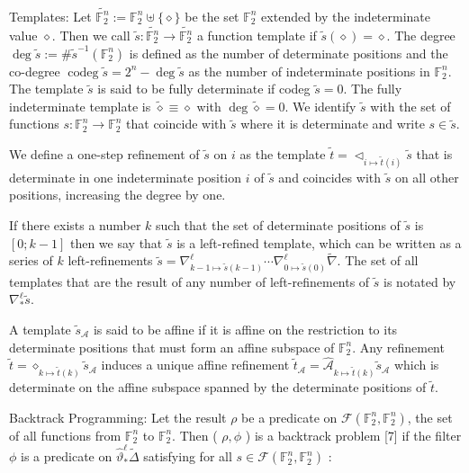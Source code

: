 \documentclass[10pt]{article}
\begin{document}
Templates: Let $\widetilde{\mathbb{F}_{2}^{n}}:=\mathbb{F}_{2}^{n} \uplus\{\diamond\}$ be the set $\mathbb{F}_{2}^{n}$ extended by the indeterminate value $\diamond$. Then we call $\tilde{s}: \widetilde{\mathbb{F}_{2}^{n}} \rightarrow \widetilde{\mathbb{F}_{2}^{n}}$ a function template if $\tilde{s}(\diamond)=\diamond$. The degree $\operatorname{deg} \tilde{s}:=\# \tilde{s}^{-1}\left(\mathbb{F}_{2}^{n}\right)$ is defined as the number of determinate positions and the co-degree $\operatorname{codeg} \tilde{s}=2^{n}-\operatorname{deg} \tilde{s}$ as the number of indeterminate positions in $\mathbb{F}_{2}^{n}$. The template $\tilde{s}$ is said to be fully determinate if codeg $\tilde{s}=0$. The fully indeterminate template is $\tilde{\diamond} \equiv \diamond$ with $\operatorname{deg} \tilde{\diamond}=0$. We identify $\tilde{s}$ with the set of functions $s: \mathbb{F}_{2}^{n} \rightarrow \mathbb{F}_{2}^{n}$ that coincide with $\tilde{s}$ where it is determinate and write $s \in \tilde{s}$.

We define a one-step refinement of $\tilde{s}$ on $i$ as the template $\tilde{t}=\triangleleft_{i \mapsto \tilde{t}(i)} \tilde{s}$ that is determinate in one indeterminate position $i$ of $\tilde{s}$ and coincides with $\tilde{s}$ on all other positions, increasing the degree by one.

If there exists a number $k$ such that the set of determinate positions of $\tilde{s}$ is $[0 ; k-1]$ then we say that $\tilde{s}$ is a left-refined template, which can be written as a series of $k$ left-refinements $\tilde{s}=\nabla_{k-1 \mapsto \tilde{s}(k-1)}^{\ell} \cdots \nabla_{0 \mapsto \tilde{s}(0)}^{\ell} \tilde{\nabla}$. The set of all templates that are the result of any number of left-refinements of $\tilde{s}$ is notated by $\nabla_{*}^{\ell} \tilde{s}$.

A template $\tilde{s}_{\mathcal{A}}$ is said to be affine if it is affine on the restriction to its determinate positions that must form an affine subspace of $\mathbb{F}_{2}^{n}$. Any refinement $\tilde{t}=\diamond_{k \mapsto \tilde{t}(k)} \tilde{s}_{\mathcal{A}}$ induces a unique affine refinement $\tilde{t}_{\mathcal{A}}=\widehat{\mathcal{A}}_{k \mapsto \tilde{t}(k)} \tilde{s}_{\mathcal{A}}$ which is determinate on the affine subspace spanned by the determinate positions of $\tilde{t}$.

Backtrack Programming: Let the result $\rho$ be a predicate on $\mathcal{F}\left(\mathbb{F}_{2}^{n}, \mathbb{F}_{2}^{n}\right)$, the set of all functions from $\mathbb{F}_{2}^{n}$ to $\mathbb{F}_{2}^{n}$. Then ( $\rho, \phi$ ) is a backtrack problem [7] if the filter $\phi$ is a predicate on $\widehat{\vartheta}_{*}^{\ell} \widetilde{\Delta}$ satisfying for all $s \in \mathcal{F}\left(\mathbb{F}_{2}^{n}, \mathbb{F}_{2}^{n}\right)$ :
\end{document}
